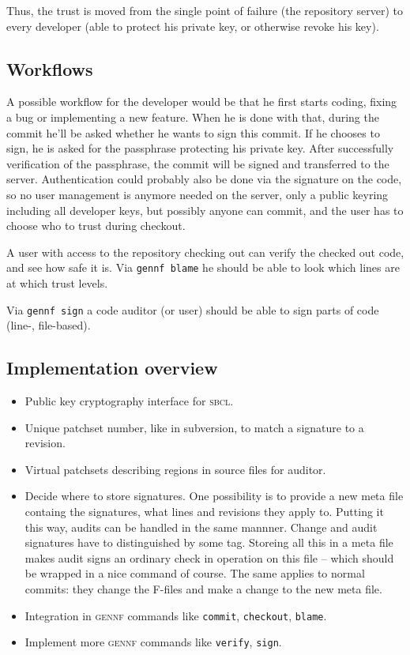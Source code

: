 \documentclass[fleqn, 10pt, a4paper]{report} \usepackage{amssymb}
\begin{document}
Thus, the trust is moved from the single point of failure (the
repository server) to every developer (able to protect his private
key, or otherwise revoke his key).

\subsection{Workflows}

A possible workflow for the developer would be that he first starts
coding, fixing a bug or implementing a new feature. When he is done
with that, during the commit he'll be asked whether he wants to sign
this commit.  If he chooses to sign, he is asked for the passphrase
protecting his private key. After successfully verification of the
passphrase, the commit will be signed and transferred to the server.
Authentication could probably also be done via the signature on the
code, so no user management is anymore needed on the server, only a
public keyring including all developer keys, but possibly anyone can
commit, and the user has to choose who to trust during checkout.

A user with access to the repository checking out can verify the
checked out code, and see how safe it is.  Via \texttt{gennf blame}
he should be able to look which lines are at which trust levels.

Via \texttt{gennf sign} a code auditor (or user) should be able to
sign parts of code (line-, file-based).

\subsection{Implementation overview}

\begin{itemize}
\item Public key cryptography interface for \textsc{sbcl}.
\item Unique patchset number, like in subversion, to match a signature
  to a revision.
\item Virtual patchsets describing regions in source files for
  auditor.
\item Decide where to store signatures.  One possibility is to provide a
  new meta file containg the signatures, what lines and revisions they
  apply to. Putting it this way, audits can be handled in the same
  mannner. Change and audit signatures have to distinguished by some
  tag. Storeing all this in a meta file makes audit signs an ordinary
  check in operation on this file -- which should be wrapped in a nice
  command of course. The same applies to normal commits: they change
  the F-files and make a change to the new meta file.
\item Integration in \textsc{gennf} commands like \texttt{commit},
  \texttt{checkout}, \texttt{blame}.
\item Implement more \textsc{gennf} commands like \texttt{verify},
  \texttt{sign}.
\end{itemize}
\end{document}
